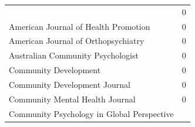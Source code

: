 \documentclass[]{tufte-handout}
\begin{document}
\begin{longtable}[]{@{}ll@{}}
\begin{minipage}[t]{0.68\columnwidth}
\end{minipage} & \begin{minipage}[t]{0.21\columnwidth}\raggedright\strut
0\strut
\end{minipage}\tabularnewline
\begin{minipage}[t]{0.68\columnwidth}\raggedright\strut
American Journal of Health Promotion\strut
\end{minipage} & \begin{minipage}[t]{0.21\columnwidth}\raggedright\strut
0\strut
\end{minipage}\tabularnewline
\begin{minipage}[t]{0.68\columnwidth}\raggedright\strut
American Journal of Orthopsychiatry\strut
\end{minipage} & \begin{minipage}[t]{0.21\columnwidth}\raggedright\strut
0\strut
\end{minipage}\tabularnewline
\begin{minipage}[t]{0.68\columnwidth}\raggedright\strut
Australian Community Psychologist\strut
\end{minipage} & \begin{minipage}[t]{0.21\columnwidth}\raggedright\strut
0\strut
\end{minipage}\tabularnewline
\begin{minipage}[t]{0.68\columnwidth}\raggedright\strut
Community Development\strut
\end{minipage} & \begin{minipage}[t]{0.21\columnwidth}\raggedright\strut
0\strut
\end{minipage}\tabularnewline
\begin{minipage}[t]{0.68\columnwidth}\raggedright\strut
Community Development Journal\strut
\end{minipage} & \begin{minipage}[t]{0.21\columnwidth}\raggedright\strut
0\strut
\end{minipage}\tabularnewline
\begin{minipage}[t]{0.68\columnwidth}\raggedright\strut
Community Mental Health Journal\strut
\end{minipage} & \begin{minipage}[t]{0.21\columnwidth}\raggedright\strut
0\strut
\end{minipage}\tabularnewline
\begin{minipage}[t]{0.68\columnwidth}\raggedright\strut
Community Psychology in Global Perspective\strut
\end{minipage} & \begin{minipage}[t]{0.21\columnwidth}\raggedright\strut

\end{minipage}
\end{longtable}
\end{document}
